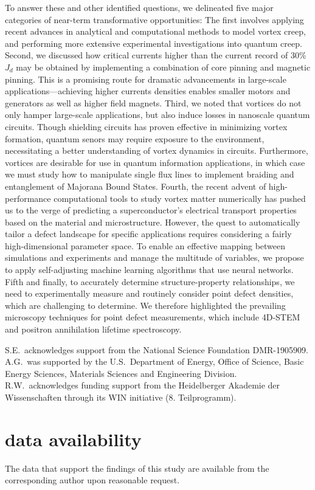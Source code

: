 \documentclass[%
 aip,
 amsmath,amssymb,
 reprint,%
floatfix]{revtex4-1}
\begin{document}
To answer these and other identified questions, we delineated five major categories of near-term transformative opportunities: The first involves applying recent advances in analytical and computational methods to model vortex creep, and performing more extensive experimental investigations into quantum creep.  Second, we discussed how critical currents higher than the current record of 30\% $J_d$ may be obtained by implementing a combination of core pinning and magnetic pinning. This is a promising route for dramatic advancements in large-scale applications---achieving higher currents densities enables smaller motors and generators as well as higher field magnets. Third, we noted that vortices do not only hamper large-scale applications, but also induce losses in nanoscale quantum circuits. Though shielding circuits has proven effective in minimizing vortex formation, quantum senors may require exposure to the environment, necessitating a better understanding of vortex dynamics in circuits. Furthermore, vortices are desirable for use in quantum information applications, in which case we must study how to manipulate single flux lines to implement braiding and entanglement of Majorana Bound States.  Fourth, the recent advent of high-performance computational tools to study vortex matter numerically has pushed us to the verge of predicting a superconductor's electrical transport properties based on the material and microstructure. However, the quest to automatically tailor a defect landscape for specific applications requires considering a fairly high-dimensional parameter space. To enable an effective mapping between simulations and experiments and manage the multitude of variables, we propose to apply self-adjusting machine learning algorithms that use neural networks. Fifth and finally, to accurately determine structure-property relationships, we need to experimentally measure and routinely consider point defect densities, which are challenging to determine. We therefore highlighted the prevailing microscopy techniques for point defect measurements, which include 4D-STEM and positron annihilation lifetime spectroscopy.  


\begin{acknowledgments}
S.E.\ acknowledges support from the National Science Foundation DMR-1905909.
%
A.G.\ was supported by the U.S.\ Department of Energy, Office of Science, Basic Energy Sciences, Materials Sciences and Engineering Division.
%
R.W.\ acknowledges funding support from the Heidelberger Akademie der Wissenschaften through its WIN initiative (8. Teilprogramm).



\end{acknowledgments}

\section*{data availability}

The data that support the findings of this study are available from the corresponding author upon reasonable request.

\end{document}
